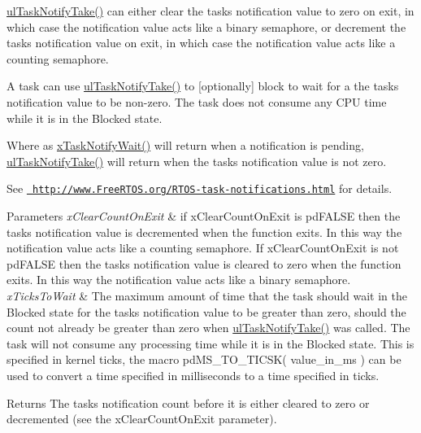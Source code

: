 \mbox{\hyperlink{task_8h_a66540bef602522a01a519f776e4c07d8}{ul\+Task\+Notify\+Take()}} can either clear the task\textquotesingle{}s notification value to zero on exit, in which case the notification value acts like a binary semaphore, or decrement the task\textquotesingle{}s notification value on exit, in which case the notification value acts like a counting semaphore.

A task can use \mbox{\hyperlink{task_8h_a66540bef602522a01a519f776e4c07d8}{ul\+Task\+Notify\+Take()}} to \mbox{[}optionally\mbox{]} block to wait for a the task\textquotesingle{}s notification value to be non-\/zero. The task does not consume any C\+PU time while it is in the Blocked state.

Where as \mbox{\hyperlink{task_8h_a0475fcda9718f403521c270a7270ff93}{x\+Task\+Notify\+Wait()}} will return when a notification is pending, \mbox{\hyperlink{task_8h_a66540bef602522a01a519f776e4c07d8}{ul\+Task\+Notify\+Take()}} will return when the task\textquotesingle{}s notification value is not zero.

See \href{http://www.FreeRTOS.org/RTOS-task-notifications.html}{\texttt{ http\+://www.\+Free\+R\+T\+O\+S.\+org/\+R\+T\+O\+S-\/task-\/notifications.\+html}} for details.


\begin{DoxyParams}{Parameters}
{\em x\+Clear\+Count\+On\+Exit} & if x\+Clear\+Count\+On\+Exit is pd\+F\+A\+L\+SE then the task\textquotesingle{}s notification value is decremented when the function exits. In this way the notification value acts like a counting semaphore. If x\+Clear\+Count\+On\+Exit is not pd\+F\+A\+L\+SE then the task\textquotesingle{}s notification value is cleared to zero when the function exits. In this way the notification value acts like a binary semaphore.\\
\hline
{\em x\+Ticks\+To\+Wait} & The maximum amount of time that the task should wait in the Blocked state for the task\textquotesingle{}s notification value to be greater than zero, should the count not already be greater than zero when \mbox{\hyperlink{task_8h_a66540bef602522a01a519f776e4c07d8}{ul\+Task\+Notify\+Take()}} was called. The task will not consume any processing time while it is in the Blocked state. This is specified in kernel ticks, the macro pd\+M\+S\+\_\+\+T\+O\+\_\+\+T\+I\+C\+S\+K( value\+\_\+in\+\_\+ms ) can be used to convert a time specified in milliseconds to a time specified in ticks.\\
\hline
\end{DoxyParams}
\begin{DoxyReturn}{Returns}
The task\textquotesingle{}s notification count before it is either cleared to zero or decremented (see the x\+Clear\+Count\+On\+Exit parameter). 
\end{DoxyReturn}
